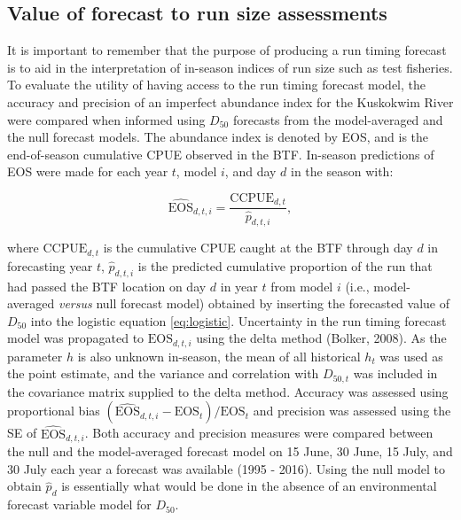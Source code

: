 \documentclass[12pt,]{book}
\theoremstyle{definition}
\theoremstyle{definition}
\theoremstyle{definition}
\theoremstyle{remark}
\begin{document}
\subsection{Value of forecast to run size
assessments}\label{value-of-forecast-to-run-size-assessments}

It is important to remember that the purpose of producing a run timing
forecast is to aid in the interpretation of in-season indices of run
size such as test fisheries. To evaluate the utility of having access to
the run timing forecast model, the accuracy and precision of an
imperfect abundance index for the Kuskokwim River were compared when
informed using \(D_{50}\) forecasts from the model-averaged and the null
forecast models. The abundance index is denoted by EOS, and is the
end-of-season cumulative CPUE observed in the BTF. In-season predictions
of EOS were made for each year \(t\), model \(i\), and day \(d\) in the
season with:

\begin{equation}
  \widehat{\text{EOS}}_{d,t,i}=\frac{\text{CCPUE}_{d,t}}{\hat{p}_{d,t,i}},
\label{eq:eos}
\end{equation}

\noindent
where \(\text{CCPUE}_{d,t}\) is the cumulative CPUE caught at the BTF
through day \(d\) in forecasting year \(t\), \(\hat{p}_{d,t,i}\) is the
predicted cumulative proportion of the run that had passed the BTF
location on day \(d\) in year \(t\) from model \(i\) (i.e.,
model-averaged \emph{versus} null forecast model) obtained by inserting
the forecasted value of \(D_{50}\) into the logistic equation
\eqref{eq:logistic}. Uncertainty in the run timing forecast model was
propagated to \(\text{EOS}_{d,t,i}\) using the delta method (Bolker,
2008). As the parameter \(h\) is also unknown in-season, the mean of all
historical \(h_t\) was used as the point estimate, and the variance and
correlation with \(D_{50,t}\) was included in the covariance matrix
supplied to the delta method. Accuracy was assessed using proportional
bias \((\widehat{\text{EOS}}_{d,t,i} - \text{EOS}_t)/\text{EOS}_t\) and
precision was assessed using the SE of \(\widehat{\text{EOS}}_{d,t,i}\).
Both accuracy and precision measures were compared between the null and
the model-averaged forecast model on 15 June, 30 June, 15 July, and 30
July each year a forecast was available (1995 - 2016). Using the null
model to obtain \(\hat{p}_d\) is essentially what would be done in the
absence of an environmental forecast variable model for \(D_{50}\).
\end{document}
